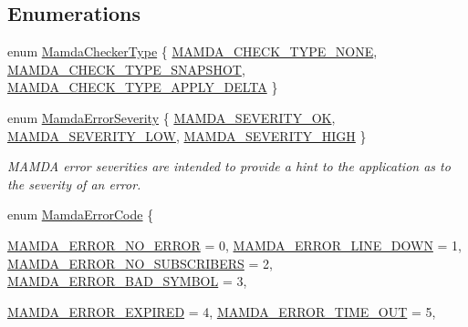 \subsection*{Enumerations}
\begin{CompactItemize}
\item 
enum \hyperlink{namespaceWombat_f4416a38ea95baf743f07d19ac9b6a4a}{Mamda\-Checker\-Type} \{ \hyperlink{namespaceWombat_f4416a38ea95baf743f07d19ac9b6a4a26b7afab3da396b3c14da7b61fd90e61}{MAMDA\_\-CHECK\_\-TYPE\_\-NONE}, 
\hyperlink{namespaceWombat_f4416a38ea95baf743f07d19ac9b6a4a9ba787f5a367fb2915ee4ac9b2438a2f}{MAMDA\_\-CHECK\_\-TYPE\_\-SNAPSHOT}, 
\hyperlink{namespaceWombat_f4416a38ea95baf743f07d19ac9b6a4af263628037ad86c8b29ba5e02171efe3}{MAMDA\_\-CHECK\_\-TYPE\_\-APPLY\_\-DELTA}
 \}
\item 
enum \hyperlink{namespaceWombat_10f0aa05514c69e0d8e360af40278c8c}{Mamda\-Error\-Severity} \{ \hyperlink{namespaceWombat_10f0aa05514c69e0d8e360af40278c8c092bddcfcf88158b06591c758ecb7c4c}{MAMDA\_\-SEVERITY\_\-OK}, 
\hyperlink{namespaceWombat_10f0aa05514c69e0d8e360af40278c8c58c16dfdae4ebf16ac64dbdec7e2c495}{MAMDA\_\-SEVERITY\_\-LOW}, 
\hyperlink{namespaceWombat_10f0aa05514c69e0d8e360af40278c8cb62106d0400ad4baa1d29f63f6f41273}{MAMDA\_\-SEVERITY\_\-HIGH}
 \}
\begin{CompactList}\small\item\em MAMDA error severities are intended to provide a hint to the application as to the severity of an error. \item\end{CompactList}\item 
enum \hyperlink{namespaceWombat_0bef5aac9df8b606704a54a376f45597}{Mamda\-Error\-Code} \{ \par
\hyperlink{namespaceWombat_0bef5aac9df8b606704a54a376f4559749e6b33e9bebe1896934585b8b01e121}{MAMDA\_\-ERROR\_\-NO\_\-ERROR} =  0, 
\hyperlink{namespaceWombat_0bef5aac9df8b606704a54a376f45597062171acd5511eba5d9ca9284e05e42b}{MAMDA\_\-ERROR\_\-LINE\_\-DOWN} =  1, 
\hyperlink{namespaceWombat_0bef5aac9df8b606704a54a376f45597dd641a6d64824166d2e70744e66d81e4}{MAMDA\_\-ERROR\_\-NO\_\-SUBSCRIBERS} =  2, 
\hyperlink{namespaceWombat_0bef5aac9df8b606704a54a376f4559731b589f2ece2778dc12d6432c5d74f54}{MAMDA\_\-ERROR\_\-BAD\_\-SYMBOL} =  3, 
\par
\hyperlink{namespaceWombat_0bef5aac9df8b606704a54a376f4559707b799353e9709f39194adfab87cc52b}{MAMDA\_\-ERROR\_\-EXPIRED} =  4, 
\hyperlink{namespaceWombat_0bef5aac9df8b606704a54a376f455974fbf9ff04cd5455c94ccea2eeeb54016}{MAMDA\_\-ERROR\_\-TIME\_\-OUT} =  5, 

\end{CompactItemize}
